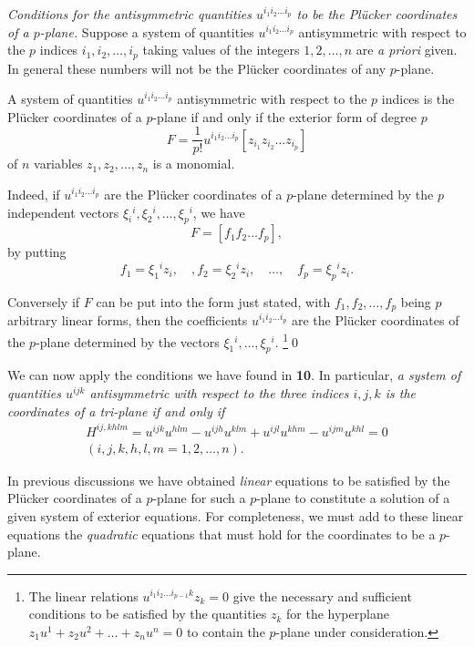 \vspace{12pt}\fsec \emph{Conditions for the antisymmetric quantities $u^{i_{1}i_{2}\dots i_{p}}$ to be the Pl\"ucker coordinates of a $p$-plane.} Suppose a system of quantities $u^{i_{1}i_{2}\dots i_{p}}$ antisymmetric with respect to the $p$ indices $i_{1},i_{2},\dots,i_{p}$ taking values of the integers $1,2,\dots,n$ are \emph{a priori} given. In general these numbers will not be the Pl\"ucker coordinates of any $p$-plane.
\begin{thm*}
   A system of quantities $u^{i_{1}i_{2}\dots i_{p}}$ antisymmetric with respect to the $p$ indices is the Pl\"ucker coordinates of a $p$-plane if and only if the exterior form of degree $p$
\[
F=\frac{1}{p!}u^{i_{1}i_{2}\dots i_{p}}[z_{i_{1}}z_{i_{2}}\dots z_{i_{p}}]
\]
of $n$ variables $z_{1},z_{2},\dots, z_{n}$ is a monomial.
\end{thm*}
Indeed, if $u^{i_{1}i_{2}\dots i_{p}}$ are the Pl\"ucker coordinates of a $p$-plane determined by the $p$ independent vectors $\xi_{i}{}^{i},\xi_{2}{}^{i},\dots,\xi_{p}{}^{i}$, we have
\[
F=[f_{1}f_{2}\dots f_{p}],
\]
by putting
\[
f_{1}=\xi_{1}{}^{i}z_{i},\quad,f_{2}=\xi_{2}{}^{i}z_{i},\quad\dots,\quad f_{p}=\xi_{p}{}^{i}z_{i}.
\]

Conversely if $F$ can be put into the form just stated, with $f_{1},f_{2},\dots,f_{p}$ being $p$ arbitrary linear forms, then the coefficients $u^{i_{1}i_{2}\dots i_{p}}$ are the Pl\"ucker coordinates of the $p$-plane determined by the vectors $\xi_{1}{}^{i},\dots,\xi_{p}{}^{i}$. \footnote{The linear relations $u^{i_{1}i_{2}\dots i_{p-1}k}z_{k}=0$ give the necessary and sufficient conditions to be satisfied by the quantities $z_{k}$ for the hyperplane $z_{1}u^{1}+z_{2}u^{2}+\dots+z_{n}u^{n}=0$ to contain the $p$-plane under consideration.}\qed

We can now apply the conditions we have found in \textsection
\textbf{10}. In particular, \emph{a system of quantities $u^{ijk}$ antisymmetric with respect to the three indices $i,j,k$ is the coordinates of a tri-plane if and only if}
\begin{gather*}
H^{ij,khlm}=u^{ijk}u^{hlm}-u^{ijh}u^{klm}+u^{ijl}u^{khm}-u^{ijm}u^{khl}=0\\
(i,j,k,h,l,m=1,2,\dots,n).
\end{gather*}

In previous discussions we have obtained  \emph{linear} equations to be satisfied by the Pl\"ucker coordinates of a $p$-plane for such a $p$-plane to constitute a solution of a given system of exterior equations. For completeness, we must add to these linear equations the \emph{quadratic} equations that must hold for the coordinates to be a $p$-plane.

